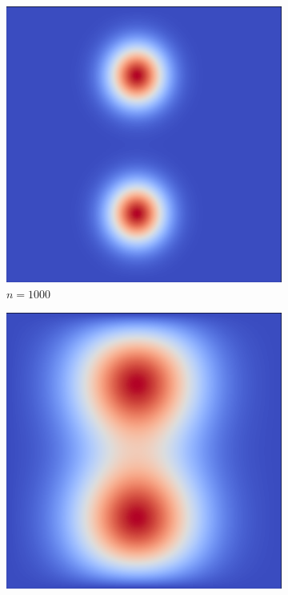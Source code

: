 \documentclass[12pt, letterpaper]{article}
\begin{document}
\begin{figure}[h]
\begin{subfigure}[b]{.21\linewidth}
    \includegraphics[width=\linewidth]{HeatProgression/diffusion1000}
    \caption{$n=1000$}
  \end{subfigure}
  \begin{subfigure}[b]{.21\linewidth}
    \includegraphics[width=\linewidth]{HeatProgression/diffusion5000}

\end{subfigure}
\end{figure}
\end{document}
